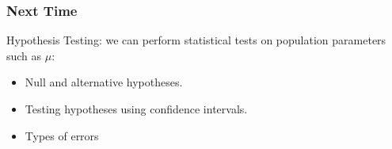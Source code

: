 \documentclass[handout]{beamer}
\newcommand{\blue}[1]{\textcolor{blue2}{#1}}
\begin{document}
%
%
%
%
%
%
%




\begin{frame}[fragile]
\frametitle{Next Time}

Hypothesis Testing:  we can perform \blue{statistical tests} on population parameters such as $\mu$:

\begin{itemize}
\item Null and alternative hypotheses.
\item Testing hypotheses using confidence intervals.
\item Types of errors
\end{itemize}


\end{frame}
\end{document}
